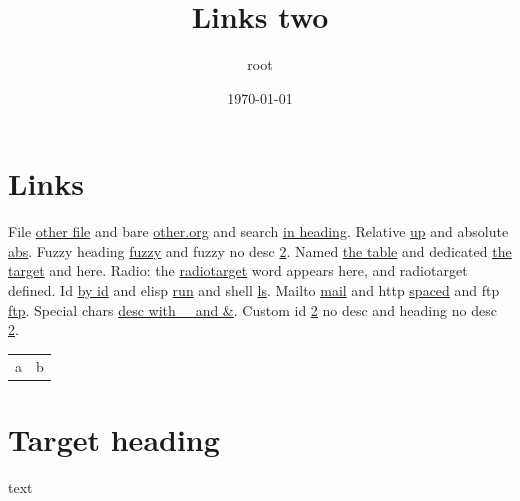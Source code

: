 \documentclass[11pt]{article}
\author{root}
\date{\today}
\title{Links two}
\begin{document}
\maketitle
\tableofcontents

\section{Links}
\label{sec:orgcb5fe53}
File \href{other.org}{other file} and bare \url{other.org} and search \href{other.org}{in heading}.
Relative \href{../up/x.txt}{up} and absolute \href{file:///tmp/x.txt}{abs}.
Fuzzy heading \hyperref[sec:org09e8721]{fuzzy} and fuzzy no desc \ref{sec:org09e8721}.
Named \hyperref[tab:orgbd79884]{the table} and dedicated \hyperref[org08af74e]{the target} and \label{org08af74e}here.
Radio: the \hyperref[orgc2c7450]{radiotarget} word appears here, and \label{orgc2c7450}radiotarget defined.
Id \hyperref[sec:org09e8721]{by id} and elisp \href{(message "hi")}{run} and shell \href{ls}{ls}.
Mailto \href{mailto:a@b.org}{mail} and http \href{http://example.org/x y}{spaced} and ftp \href{ftp://example.org/f}{ftp}.
Special chars \href{https://example.org/a\%20b?c=d\&e=f\#g}{desc with \_ and \&}.
Custom id \ref{sec:org09e8721} no desc and heading no desc \ref{sec:org09e8721}.
\begin{table}[htbp]
\label{tab:orgbd79884}
\centering
\begin{tabular}{ll}
a & b\\[0pt]
\end{tabular}
\end{table}
\section{Target heading}
\label{sec:org09e8721}
text
\end{document}
